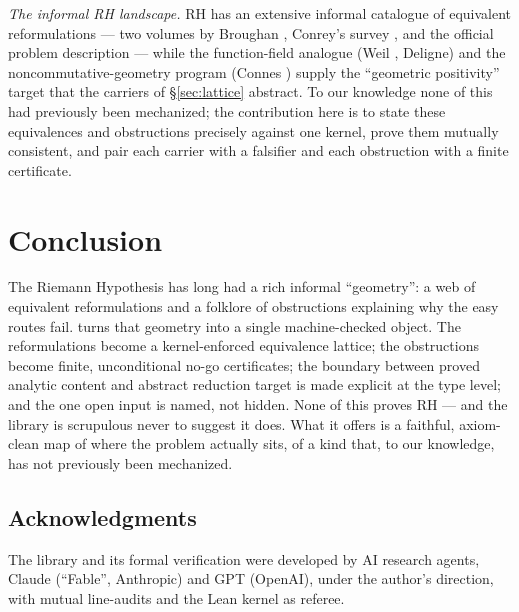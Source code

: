 \documentclass[11pt]{amsart}
\theoremstyle{definition}
\theoremstyle{remark}
\newcommand{\code}[1]{\texttt{\seqsplit{#1}}}
\begin{document}
\emph{The informal RH landscape.} RH has an extensive informal catalogue of
equivalent reformulations --- two volumes by Broughan \cite{broughan}, Conrey's
survey \cite{conrey}, and the official problem description \cite{bombieri} ---
while the function-field analogue (Weil \cite{weil}, Deligne) and the
noncommutative-geometry program (Connes \cite{connes}) supply the
``geometric positivity'' target that the carriers of \S\ref{sec:lattice}
abstract. To our knowledge none of this had previously been mechanized; the
contribution here is to state these equivalences and obstructions precisely
against one kernel, prove them mutually consistent, and pair each carrier with a
falsifier and each obstruction with a finite certificate.

\section{Conclusion}\label{sec:concl}

The Riemann Hypothesis has long had a rich informal ``geometry'': a web of
equivalent reformulations and a folklore of obstructions explaining why the
easy routes fail. \code{jensen-ladder} turns that geometry into a single
machine-checked object. The reformulations become a kernel-enforced equivalence
lattice; the obstructions become finite, unconditional no-go certificates; the
boundary between proved analytic content and abstract reduction target is made
explicit at the type level; and the one open input is named, not hidden. None of
this proves RH --- and the library is scrupulous never to suggest it does. What
it offers is a faithful, axiom-clean map of where the problem actually sits, of
a kind that, to our knowledge, has not previously been mechanized.

\subsection*{Acknowledgments}
The library and its formal verification were developed by AI research agents,
Claude (``Fable'', Anthropic) and GPT (OpenAI), under the author's direction,
with mutual line-audits and the Lean kernel as referee.
\end{document}

